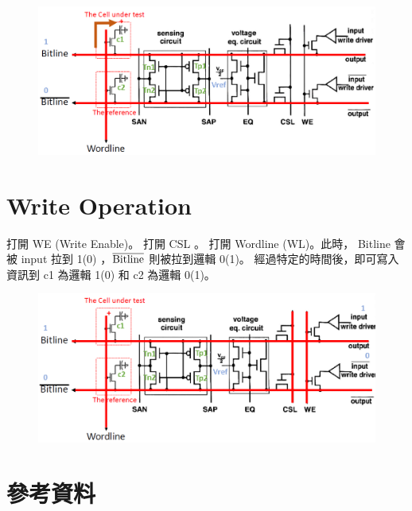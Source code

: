 \documentclass{article}
\begin{document}
\begin{figure}[H]
\centering
\includegraphics[width = 0.6\linewidth]{./img/2023-11-29-23-59-52.png}
\end{figure}

\clearpage

\section{Write Operation}

打開 WE (Write Enable)。 打開 CSL 。 打開 Wordline (WL)。此時， Bitline 會被 input 拉到 1(0) ，$\rm\overline{Bitline}$ 則被拉到邏輯 0(1)。
經過特定的時間後，即可寫入資訊到 c1  為邏輯 1(0) 和 c2 為邏輯 0(1)。


\begin{figure}[H]
  \centering
  \includegraphics[width = 0.6\linewidth]{./img/2023-11-30-00-23-23.png}
  \end{figure}

  \section{參考資料}
\end{document}

